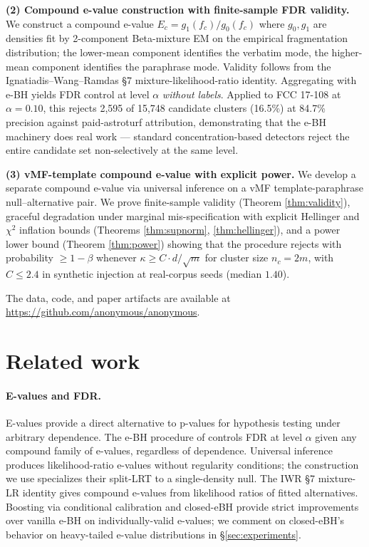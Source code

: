 \documentclass{article}
\theoremstyle{definition}
\theoremstyle{remark}
\begin{document}
\textbf{(2) Compound e-value construction with finite-sample FDR validity.} We construct a compound e-value $E_c = g_1(f_c) / g_0(f_c)$ where $g_0, g_1$ are densities fit by 2-component Beta-mixture EM on the empirical fragmentation distribution; the lower-mean component identifies the verbatim mode, the higher-mean component identifies the paraphrase mode. Validity follows from the Ignatiadis--Wang--Ramdas \citeyearpar{iwr2024} \S 7 mixture-likelihood-ratio identity. Aggregating with e-BH \citep{wangramdas2022} yields FDR control at level $\alpha$ \emph{without labels}. Applied to FCC 17-108 at $\alpha = 0.10$, this rejects 2{,}595 of 15{,}748 candidate clusters (16.5\%) at 84.7\% precision against paid-astroturf attribution, demonstrating that the e-BH machinery does real work --- standard concentration-based detectors reject the entire candidate set non-selectively at the same level.

\textbf{(3) vMF-template compound e-value with explicit power.} We develop a separate compound e-value via universal inference \citep{wrb2020} on a vMF template-paraphrase null--alternative pair. We prove finite-sample validity (Theorem \ref{thm:validity}), graceful degradation under marginal mis-specification with explicit Hellinger and $\chi^2$ inflation bounds (Theorems \ref{thm:supnorm}, \ref{thm:hellinger}), and a power lower bound (Theorem \ref{thm:power}) showing that the procedure rejects with probability $\ge 1 - \beta$ whenever $\kappa \ge C \cdot d / \sqrt{m}$ for cluster size $n_c = 2m$, with $C \le 2.4$ in synthetic injection at real-corpus seeds (median $1.40$).

The data, code, and paper artifacts are available at \url{https://github.com/anonymous/anonymous}.

\section{Related work}
\label{sec:related}

\paragraph{E-values and FDR.} E-values \citep{vovk2021,gw2024} provide a direct alternative to p-values for hypothesis testing under arbitrary dependence. The e-BH procedure of \citet{wangramdas2022} controls FDR at level $\alpha$ given any compound family of e-values, regardless of dependence. Universal inference \citep{wrb2020} produces likelihood-ratio e-values without regularity conditions; the construction we use specializes their split-LRT to a single-density null. The IWR \citeyearpar{iwr2024} \S 7 mixture-LR identity gives compound e-values from likelihood ratios of fitted alternatives. Boosting via conditional calibration \citep{leeren2024} and closed-eBH \citep{xfr2025} provide strict improvements over vanilla e-BH on individually-valid e-values; we comment on closed-eBH's behavior on heavy-tailed e-value distributions in \S\ref{sec:experiments}.
\end{document}
